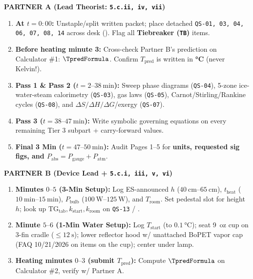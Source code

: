 \begin{formulacard}
\begin{twocol}[0.485]
\textbf{\sffamily\color{navy} PARTNER A (Lead Theorist: \texttt{5.c.ii, iv, vii})}
\begin{enumerate}
  \item \textbf{At $t = 0{:}00$:} Unstaple/split written packet; place detached \texttt{QS-01, 03, 04, 06, 07, 08, 14} across desk (). Flag all \textbf{Tiebreaker (\texttt{TB})} items.
  \item \textbf{Before heating minute 3:} Cross-check Partner B's prediction on Calculator \#1: $\TpredFormula$. Confirm $T_{\mathrm{pred}}$ is written in \textbf{\si{\celsius}} (never Kelvin!). \HandInRule
  \item \textbf{Pass 1 \& Pass 2 ($t = 2\text{--}\SI{38}{\minute}$):} Sweep phase diagrams (\texttt{QS-04}), 5-zone ice-water-steam calorimetry (\texttt{QS-03}), gas laws (\texttt{QS-05}), Carnot/Stirling/Rankine cycles (\texttt{QS-08}), and $\Delta S/\Delta H/\Delta G$/exergy (\texttt{QS-07}).
  \item \textbf{Pass 3 ($t = 38\text{--}\SI{47}{\minute}$):} Write symbolic governing equations on every remaining Tier 3 subpart + carry-forward values.
  \item \textbf{Final 3 Min ($t = 47\text{--}\SI{50}{\minute}$):} Audit Pages 1--5 for \textbf{units, requested sig figs, and $P_{\mathrm{abs}} = P_{\mathrm{gauge}} + P_{\mathrm{atm}}$}.
\end{enumerate}
\nextcol[0.485]
\textbf{\sffamily\color{slate} PARTNER B (Device Lead + \texttt{5.c.i, iii, v, vi})}
\begin{enumerate}
  \item \textbf{Minutes $0\text{--}5$ (3-Min Setup):} Log ES-announced $h$ ($\SIrange{40}{65}{\centi\meter}$), $t_{\mathrm{heat}}$ ($\SIrange{10}{15}{\minute}$), $P_{\mathrm{bulb}}$ ($\SIrange{100}{125}{\watt}$), and $T_{\mathrm{room}}$. Set pedestal slot for height $h$; look up $\mathrm{TG}_{\mathrm{tab}}, k_{\mathrm{start}}, k_{\mathrm{room}}$ on \texttt{QS-13} / .
  \item \textbf{Minute $5\text{--}6$ (1-Min Water Setup):} Log $T_{\mathrm{start}}$ (to $\SI{0.1}{\celsius}$); seat \SI{9}{oz} cup on 3-fin cradle ($\le \SI{12}{\second}$); lower reflector hood w/ unattached BoPET vapor cap (FAQ 10/21/2026 on items on the cup); center under lamp.
  \item \textbf{Heating minutes $0\text{--}3$ (submit $T_{\mathrm{pred}}$):} Compute $\TpredFormula$ on Calculator \#2, verify w/ Partner A. \textbf{\HandInRule}

\end{enumerate}
\end{twocol}
\end{formulacard}
